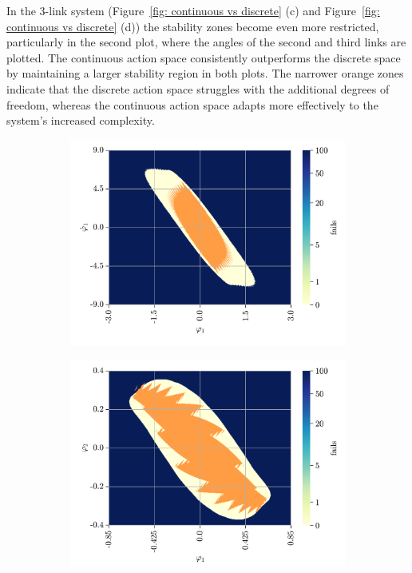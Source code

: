 In the 3-link system (Figure~\ref{fig: continuous vs discrete} (c) and Figure~\ref{fig: continuous vs discrete} (d)) the stability zones become even more restricted, particularly in the second plot, where the angles of the second and third links are plotted. The continuous action space consistently outperforms the discrete space by maintaining a larger stability region in both plots. The narrower orange zones indicate that the discrete action space struggles with the additional degrees of freedom, whereas the continuous action space adapts more effectively to the system's increased complexity.

\begin{figure}[h!]
	\centering
	\begin{subfigure}[t]{0.48\textwidth}
		\centering
		\includegraphics[width=\textwidth]{Figures/SP_continuous_vs_discrete_phi1phi1dot.png}
		\label{fig: sp - continuous vs discrete}
		\caption{}
	\end{subfigure}
	\hfill
	\begin{subfigure}[t]{0.48\textwidth}
		\centering
		\includegraphics[width=\textwidth]{Figures/DP_continuous_vs_discrete_phi1phi2.png}
		\label{fig: dp - continuous vs discrete}
		\caption{}
	\end{subfigure}
	

\end{figure}
